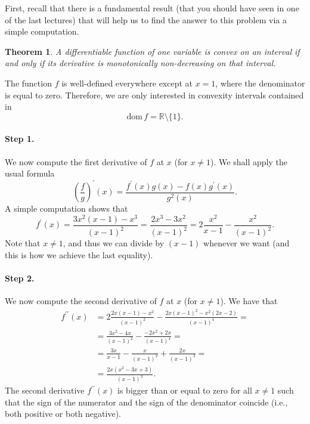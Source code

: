 \documentclass[a4paper,10 pt]{report}
\newtheorem{theorem}{Theorem}[chapter]
\theoremstyle{definition}
\newcommand{\R}{\mathbb R}
\begin{document}
\begin{solutionBox} First, recall that there is a fundamental result (that you should have seen in one of the last lectures) that will help us to find the answer to this problem via a simple computation.

\begin{theorem} A differentiable function of one variable is convex on an interval if and only if its derivative is monotonically non-decreasing on that interval. \end{theorem}

The function $f$ is well-defined everywhere except at $x = 1$, where the denominator is equal to zero. Therefore, we are only interested in convexity intervals contained in
\begin{equation*}\mathrm{dom} \, f = \R \setminus \{1\}. \end{equation*}

\paragraph{Step 1.} We now compute the first derivative of $f$ at $x$ (for $x \neq 1$). We shall apply the usual formula
\begin{equation*}\left( \frac{f}{g} \right)^\prime(x) = \frac{f^\prime(x) g(x) - f(x) g^\prime(x)}{g^2(x)}. \end{equation*}A simple computation shows that
\begin{equation*}f^\prime(x) = \frac{3x^2(x - 1) - x^3}{(x - 1)^2} = \frac{2x^3 - 3x^2}{(x - 1)^2} = 2 \frac{x^2}{x - 1} - \frac{x^2}{(x - 1)^2}.\end{equation*}
Note that $x \neq 1$, and thus we can divide by $(x - 1)$ whenever we want (and this is how we achieve the last equality).

\paragraph{Step 2.} We now compute the second derivative of $f$ at $x$ (for $x \neq 1$). We have that
\begin{equation*}\begin{aligned} f^{\prime\prime}(x) & = 2 \frac{2x(x - 1) - x^2}{(x - 1)^2} - \frac{2x(x - 1)^2 - x^2(2x - 2)}{(x - 1)^4} =
\\[1em] & = \frac{3x^2 - 4x}{(x - 1)^2} - \frac{ - 2x^2 + 2x }{(x - 1)^4} =
\\[1em] & = \frac{3x}{x - 1} - \frac{x}{(x - 1)^2} + \frac{2x}{(x - 1)^3} =
\\[1em] & = \frac{2x(x^2 - 3x + 3)}{(x - 1)^3}. \end{aligned} \end{equation*}
The second derivative $f^{\prime\prime}(x)$ is bigger than or equal to zero for all $x \neq 1$ such that the sign of the numerator and the sign of the denominator coincide (i.e., both positive or both negative).


\end{solutionBox}
\end{document}
